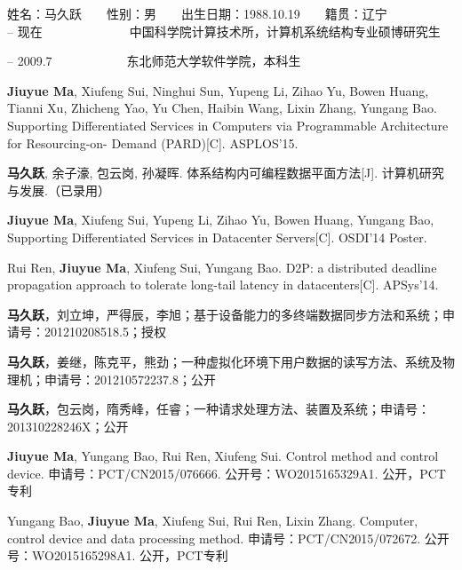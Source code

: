 \begin{resume}

\noindent
姓名：马久跃　　性别：男　　出生日期：1988.10.19　　籍贯：辽宁\\

 -- 现在　　　　　　　中国科学院计算技术所，计算机系统结构专业硕博研究生

 -- 2009.7　　　　　　东北师范大学软件学院，本科生\\

  \begin{enumerate}[leftmargin=1.5\parindent, nolistsep, label={[\arabic*]}]
    \item \textbf{Jiuyue Ma}, Xiufeng Sui, Ninghui Sun, Yupeng Li, Zihao Yu, Bowen Huang, Tianni Xu, Zhicheng Yao, Yu Chen, Haibin Wang, Lixin Zhang, Yungang Bao.
          Supporting Differentiated Services in Computers via Programmable Architecture for Resourcing-on- Demand (PARD)[C]. ASPLOS'15.
    \item \textbf{马久跃}, 余子濠, 包云岗, 孙凝晖. 体系结构内可编程数据平面方法[J]. 计算机研究与发展.（已录用）
    \item \textbf{Jiuyue Ma}, Xiufeng Sui, Yupeng Li, Zihao Yu, Bowen Huang, Yungang Bao, Supporting Differentiated Services in Datacenter Servers[C]. OSDI'14 Poster.
    \item Rui Ren, \textbf{Jiuyue Ma}, Xiufeng Sui, Yungang Bao. D2P: a distributed deadline propagation approach to tolerate long-tail latency in datacenters[C]. APSys'14.
  \end{enumerate}

  \begin{enumerate}[leftmargin=1.5\parindent, nolistsep, label={[\arabic*]}]
    \item \textbf{马久跃}，刘立坤，严得辰，李旭；基于设备能力的多终端数据同步方法和系统；申请号：201210208518.5；授权
    \item \textbf{马久跃}，姜继，陈克平，熊劲；一种虚拟化环境下用户数据的读写方法、系统及物理机；申请号：201210572237.8；公开
    \item \textbf{马久跃}，包云岗，隋秀峰，任睿；一种请求处理方法、装置及系统；申请号：201310228246X；公开
    \item  \textbf{Jiuyue Ma}, Yungang Bao, Rui Ren, Xiufeng Sui. Control method and control device. 申请号：PCT/CN2015/076666. 公开号：WO2015165329A1. 公开，PCT专利
    \item  Yungang Bao, \textbf{Jiuyue Ma}, Xiufeng Sui, Rui Ren, Lixin Zhang. Computer, control device and data processing method. 申请号：PCT/CN2015/072672. 公开号：WO2015165298A1. 公开，PCT专利
  \end{enumerate}


\end{resume}
